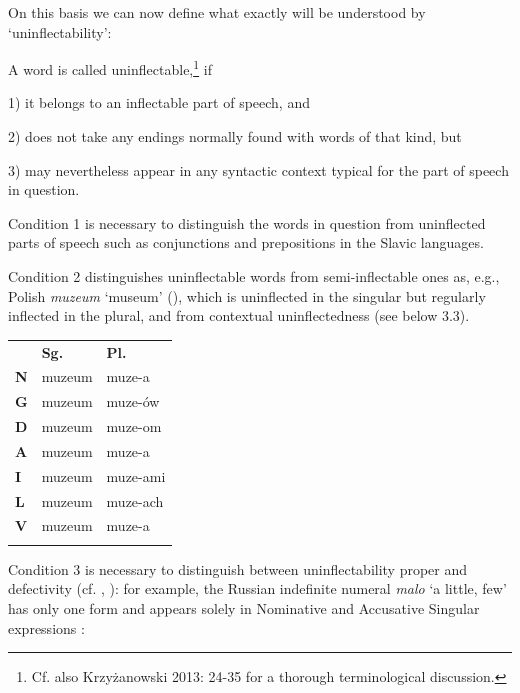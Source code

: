 \documentclass[output=paper]{langscibook}
\begin{document}
On this basis we can now define what exactly will be understood by ‘uninflectability’:

A word is called uninflectable,\footnote{\textrm{Cf. also} \textrm{Krzyżanowski 2013: 24-35 for a thorough terminological discussion.}} if

1) it belongs to an inflectable part of speech, and

2) does not take any endings normally found with words of that kind, but

3) may nevertheless appear in any syntactic context typical for the part of speech in question.

Condition 1 is necessary to distinguish the words in question from uninflected parts of speech such as conjunctions and prepositions in the Slavic languages. 

Condition 2 distinguishes uninflectable words from semi-inflectable ones as, e.g., Polish \textit{muzeum} ‘museum’ (), which is uninflected in the singular but regularly inflected in the plural, and from contextual uninflectedness (see below 3.3).


\begin{tabularx}{\textwidth}{XXX}

\lsptoprule

\textbf{~} & \textbf{Sg.} & \textbf{Pl.}\\
\textbf{N} & muzeum & muze-a\\
\textbf{G} & muzeum & muze-ów\\
\textbf{D} & muzeum & muze-om\\
\textbf{A} & muzeum & muze-a\\
\textbf{I} & muzeum & muze-ami\\
\textbf{L} & muzeum & muze-ach\\
\textbf{V} & muzeum & muze-a\\
\lspbottomrule
\end{tabularx}
\begin{table}
\caption{semi-inflectable nouns in Polish}
\label{tab:key:2}
\end{table}

Condition 3 is necessary to distinguish between uninflectability proper and defectivity (cf. \citealt{Doleschal2000}, \citealt{Spencer2020}): for example, the Russian indefinite numeral \textit{malo} ‘a little, few’ has only one form and appears solely in Nominative and Accusative Singular expressions : 
\end{document}
